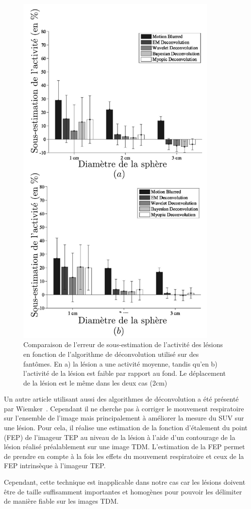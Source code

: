 \begin{figure}[h!]
	\begin{center}
		\includegraphics[width=10cm]{images/performanceDeconvolution}
	\end{center}
	\caption[Comparaison de l'erreur de sous-estimation de l'activité des lésions]{Comparaison de l'erreur de sous-estimation de l'activité des lésions en fonction de l'algorithme de déconvolution utilisé sur des fantômes. En a) la lésion a une activité moyenne, tandis qu'en b) l'activité de la lésion est faible par rapport au fond. Le déplacement de la lésion est le même dans les deux cas (2cm)} 
	\label{fig:performanceDeconvolution}
\end{figure}


Un autre article utilisant aussi des algorithmes de déconvolution a été présenté par Wiemker~\cite{wiemker2008combined}. Cependant il ne cherche pas à corriger le mouvement respiratoire sur l'ensemble de l'image mais principalement à améliorer la mesure du SUV sur une lésion. Pour cela, il réalise une estimation de la fonction d'étalement du point (FEP) de l'imageur TEP au niveau de la lésion à l'aide d'un contourage de la lésion réalisé préalablement sur une image TDM. L'estimation de la FEP permet de prendre en compte à la fois les effets du mouvement respiratoire et ceux de la FEP intrinsèque à l'imageur TEP. 

Cependant, cette technique est inapplicable dans notre cas car les lésions doivent être de taille suffisamment importantes et homogènes pour pouvoir les délimiter de manière fiable sur les images TDM.
